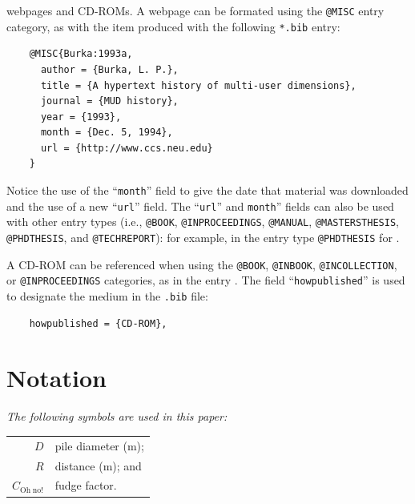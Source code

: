 \documentclass[Journal,letterpaper,NoLineNumbers]{ascelike-new}
\begin{document}
webpages and CD-ROMs.  A webpage can be formated using the
\texttt{@MISC} entry category, as with the item \cite{Burka:1993a} produced
with the following \texttt{*.bib} entry:
\begin{verbatim}
    @MISC{Burka:1993a,
      author = {Burka, L. P.},
      title = {A hypertext history of multi-user dimensions},
      journal = {MUD history},
      year = {1993},
      month = {Dec. 5, 1994},
      url = {http://www.ccs.neu.edu}
    }
\end{verbatim}
Notice the use of the ``\texttt{month}'' field to give the date that material
was downloaded and the use of a new ``\texttt{url}'' field.
The ``\texttt{url}'' and \texttt{month}'' 
fields can also be used with other entry types
(i.e., \texttt{@BOOK}, \texttt{@INPROCEEDINGS}, \texttt{@MANUAL},
\texttt{@MASTERSTHESIS}, \texttt{@PHDTHESIS}, and \texttt{@TECHREPORT}):
for example, in the entry type \texttt{@PHDTHESIS} for \cite{Wichtmann:2005a}.
%
\par
A CD-ROM can be referenced when using the \texttt{@BOOK}, \texttt{@INBOOK},
\texttt{@INCOLLECTION}, or \texttt{@INPROCEEDINGS} categories, 
as in the entry \cite{Liggett:1998a}.
The field ``\texttt{howpublished}'' is used to designate the medium
in the \texttt{.bib} file:
\begin{verbatim}
    howpublished = {CD-ROM},
\end{verbatim}
%
\pagebreak
%
\appendix
%
%
\section{Notation}
\label{app:notation}
\emph{The following symbols are used in this paper:}%
\nopagebreak
\par
\begin{tabular}{r  @{\hspace{1em}=\hspace{1em}}  l}
$D$                    & pile diameter (m); \\
$R$                    & distance (m);      and\\
$C_{\mathrm{Oh\;no!}}$ & fudge factor.
\end{tabular}
\end{document}
